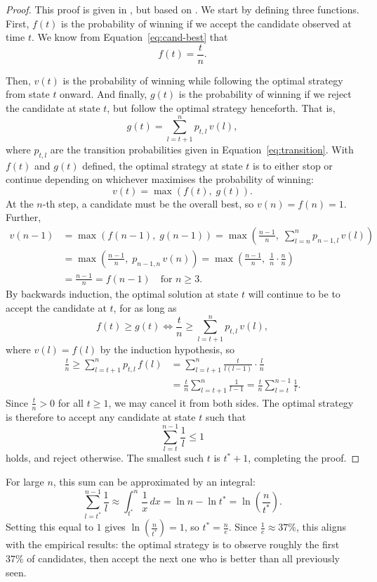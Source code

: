 \begin{proof}
    This proof is given in  \cite{quine1996exact}, but based on  \cite{dynkin1963optimal}.
    We start by defining three functions. First, $f(t)$ is the probability of winning if we accept the candidate observed at time $t$. We know from Equation~\ref{eq:cand-best} that 
    \[
        f(t) = \frac{t}{n}.
    \]
    
    Then, $v(t)$ is the probability of winning while following the optimal strategy from state $t$ onward. And finally, $g(t)$ is the probability of winning if we reject the candidate at state $t$, but follow the optimal strategy henceforth. That is,
    \[
    g(t) = \sum_{l=t+1}^n p_{t,l}\,v(l),
    \]
    where $p_{t,l}$ are the transition probabilities given in Equation~\ref{eq:transition}.
    With $f(t)$ and $g(t)$ defined, the optimal strategy at state $t$ is to either stop or continue depending on whichever maximises the probability of winning:
    \[
        v(t) = \max\!(f(t),\; g(t)).
    \]
    At the $n$-th step, a candidate must be the overall best, so $v(n) = f(n) = 1$. Further,
    \begin{align*}
    v(n-1) &= \max\!(f(n-1),\; g(n-1) ) = \max\!(\frac{n-1}{n},\; \sum_{l=n}^n p_{n-1, l}\, v(l) ) \\
    &= \max\!(\frac{n-1}{n},\; p_{n-1, n}\, v(n) ) = \max\!( \frac{n-1}{n},\; \frac{1}{n} \cdot \frac{n}{n} ) \\
    &= \frac{n-1}{n} = f(n-1) \quad \text{for } n\geq 3.
    \end{align*}
    By backwards induction, the optimal solution at state $t$ will continue to be to accept the candidate at $t$, for as long as
    \[
    f(t) \geq g(t) \iff \frac{t}{n} \geq \sum_{l=t+1}^n p_{t, l}\, v(l),
    \]
    where $v(l) = f(l)$ by the induction hypothesis, so
    \begin{align*}
    \frac{t}{n} \geq \sum_{l=t+1}^n p_{t,l}\, f(l) &= \sum_{l=t+1}^n \frac{t}{l(l-1)} \cdot \frac{l}{n} \\
    &= \frac{t}{n} \sum_{l=t+1}^n \frac{1}{l-1} = \frac{t}{n} \sum_{l=t}^{n-1} \frac{1}{l}.
    \end{align*}
    Since $\frac{t}{n} > 0$ for all $t \geq 1$, we may cancel it from both sides. The optimal strategy is therefore to accept any candidate at state $t$ such that 
    \[
    \sum_{l=t}^{n-1} \frac{1}{l} \leq 1
    \]
    holds, and reject otherwise. The smallest such $t$ is $t^* + 1$, completing the proof.
\end{proof}
\begin{remark}
For large $n$, this sum can be approximated by an integral:
\[
\sum_{l=t^*}^{n-1} \frac{1}{l} \approx \int_{t^*}^{n} \frac{1}{x}\, dx = \ln n - \ln t^* = \ln\!(\frac{n}{t^*}).
\]
Setting this equal to $1$ gives $\ln\!\left(\frac{n}{t^*}\right) = 1$, so $t^* = \frac{n}{e}$. Since $\frac{1}{e} \approx 37\%$, this aligns with the empirical results: the optimal strategy is to observe roughly the first $37\%$ of candidates, then accept the next one who is better than all previously seen.
\end{remark}